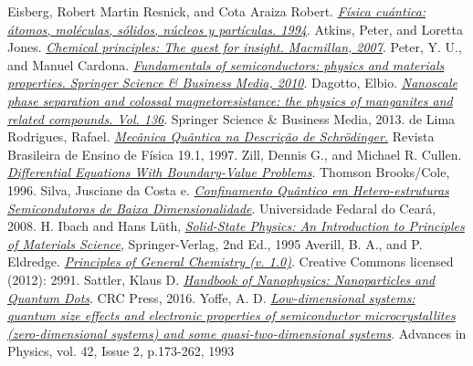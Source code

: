   Eisberg, Robert Martin Resnick, and Cota Araiza Robert. \href{http://gen.lib.rus.ec/book/index.php?md5=80CCC290E6FFF645ADF0BA24178E4C5D}\textit{Física cuántica: átomos, moléculas, sólidos, núcleos y partículas. 1994}.
  Atkins, Peter, and Loretta Jones. \href{http://gen.lib.rus.ec/book/index.php?md5=6D32E94CECA0A9BD6FFF5F1307078071}\textit{Chemical principles: The quest for insight. Macmillan, 2007}.
  Peter, Y. U., and Manuel Cardona. \href{http://gen.lib.rus.ec/book/index.php?md5=20A8507AB491C812ED2C75D08740987A}\textit{Fundamentals of semiconductors: physics and materials properties. Springer Science \& Business Media, 2010}.
  Dagotto, Elbio. \href{http://gen.lib.rus.ec/book/index.php?md5=3C621FEBFE1EBBF8B376CED188D04A84}\textit{Nanoscale phase separation and colossal magnetoresistance: the physics of manganites and related compounds. Vol. 136}. Springer Science \& Business Media, 2013.
  de Lima Rodrigues, Rafael. \href{http://sbfisica.org.br/rbef/pdf/v19_68.pdf}\textit{Mecânica Quântica na Descrição de Schrödinger.} Revista Brasileira de Ensino de Física 19.1, 1997.
  Zill, Dennis G., and Michael R. Cullen. \href{http://gen.lib.rus.ec/book/index.php?md5=8673E58CC84FED5F909BEA1CC2BC4E3F}\textit{Differential Equations With Boundary-Value Problems}. Thomson Brooks/Cole, 1996.
  Silva, Jusciane da Costa e. \href{www.repositorio.ufc.br/bitstream/riufc/12669/1/2008_tese_jcsilva.pdf}\textit{Confinamento Quântico em Hetero-estruturas Semicondutoras de Baixa Dimensionalidade}. Universidade Fedaral do Ceará, 2008.
  H. Ibach and Hans Lüth, \href{http://www.springer.com/us/book/9783540938033}\textit{Solid-State Physics: An Introduction to Principles of Materials Science}, Springer-Verlag, 2nd Ed., 1995
 Averill, B. A., and P. Eldredge. \href{https://2012books.lardbucket.org/books/principles-of-general-chemistry-v1.0m/index.html}\textit{Principles of General Chemistry (v. 1.0)}. Creative Commons licensed (2012): 2991.
 Sattler, Klaus D. \href{https://www.amazon.com/Handbook-Nanophysics-Nanoparticles-Quantum-Dots-ebook/dp/B008I9VLAI}\textit{Handbook of Nanophysics: Nanoparticles and Quantum Dots}. CRC Press, 2016.
 Yoffe, A. D. \href{http://adsabs.harvard.edu/abs/1993AdPhy..42..173Y}\textit{Low-dimensional systems: quantum size effects and electronic properties of semiconductor microcrystallites (zero-dimensional systems) and some quasi-two-dimensional systems}. Advances in Physics, vol. 42, Issue 2, p.173-262, 1993
